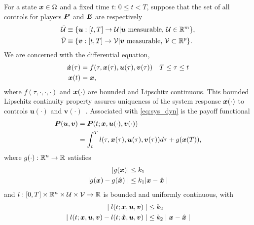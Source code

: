 For a state $\bm{x} \in \Omega$ and a fixed time $t$: $0 \le t < T$, suppose that the set of all controls for players $\bm{P}$ and $\bm{E}$ are respectively
%
\begin{align}
	\mathcal{\bar{U}} &\equiv \{\bm{u}: [t, T] \rightarrow \mathcal{U} | \bm{u} \text{ measurable}, \, \mathcal{U} \in \mathbb{R}^m \}, \\
	\mathcal{\bar{V}} &\equiv \{\bm{v}: [t, T] \rightarrow \mathcal{V} | \bm{v} \text{ measurable},  \,\mathcal{V} \subset \mathbb{R}^p\}.
\end{align}
%
\noindent We are concerned with the  differential equation,
%
\begin{subequations}
	\begin{align}
		\dot{\bm{x}}(\tau) &= f(\tau, \bm{x}(\tau), \bm{u}(\tau), \bm{v}(\tau)) \quad T \le \tau \le t \\
		\bm{x}(t) &= \bm{x},
	\end{align}
	\label{eq:sys_dyn}
\end{subequations}
%
\noindent where $f(\tau, \cdot, \cdot, \cdot)$ and $\bm{x}(\cdot)$ are bounded and Lipschitz continuous. This bounded Lipschitz continuity property assures uniqueness of the system response $\bm{x}(\cdot)$ to controls $\bm{u}(\cdot)$ and $\bm{v}(\cdot)$~\cite{Souganidis}. %
%
Associated with \eqref{eq:sys_dyn} is the payoff functional %
%
\begin{align}
	\bm{P}(\bm{u}, \bm{v}) &=	\bm{P}(t; \state, \bm{u}(\cdot), \bm{v}(\cdot)) \nonumber \\
	&= \int_{t}^{T} l(\tau, \state(\tau), \bm{u}(\tau), \bm{v}(\tau)) d\tau + g(\state(T)),
	\label{eq:payoff}
\end{align}
%
where $g(\cdot): \mathbb{R}^n \rightarrow \mathbb{R}$ %
satisfies
%
\begin{subequations}
	\begin{align}
		| g(\bm{x}) | &\le k_1 \\
		| g(\bm{x}) - g(\hat{\bm{x}}) \mid &\le k_1 | \bm{x} - \hat{\bm{x}} \mid
	\end{align}
\end{subequations}
%
and $l:[0, T] \times  \mathbb{R}^n \times \mathcal{U} \times \mathcal{V} \rightarrow \mathbb{R}$ is bounded and uniformly continuous, with
%
\begin{subequations}
	\begin{align}
		\mid l(t; \bm{x}, \bm{u}, \bm{v}) \mid &\le k_2 \\
		\mid l(t; \bm{x}, \bm{u}, \bm{v})  -  l(t; \hat{\bm{x}}, \bm{u}, \bm{v}) \mid & \le k_2 \mid \bm{x} - \hat{\bm{x}} \mid
	\end{align}
\end{subequations}
